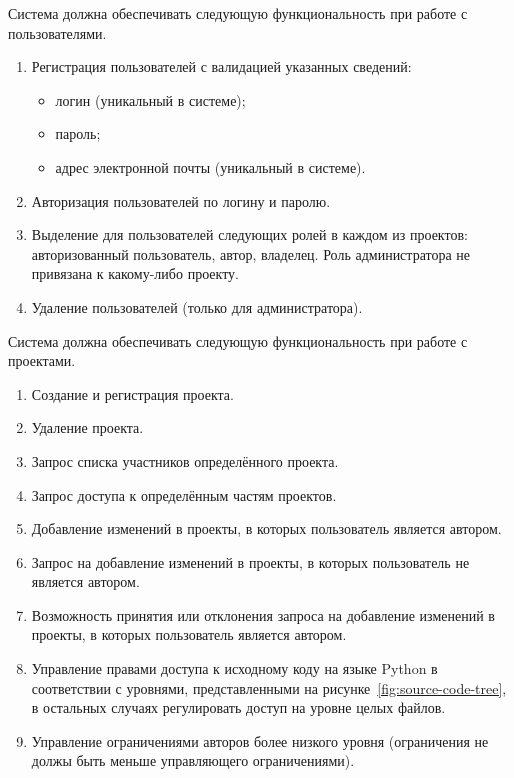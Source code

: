 \documentclass{bmstu}
\begin{document}
  Система должна обеспечивать следующую функциональность при работе с пользователями.
  \begin{enumerate}[label*=\arabic*.]
    \item Регистрация пользователей с валидацией указанных
      сведений:
      \begin{itemize}[label=---]
        \item логин (уникальный в системе);
        \item пароль;
        \item адрес электронной почты (уникальный в системе).
      \end{itemize}
    \item Авторизация пользователей по логину и паролю.
    \item Выделение для пользователей следующих ролей в каждом из проектов: авторизованный пользователь, автор, владелец. Роль администратора не привязана к какому-либо проекту.
    \item Удаление пользователей (только для администратора).
  \end{enumerate}

  Система должна обеспечивать следующую функциональность при работе с проектами.
  \begin{enumerate}[label*=\arabic*.]
    \item Создание и регистрация проекта.
    \item Удаление проекта.
    \item Запрос списка участников определённого проекта.
    \item Запрос доступа к определённым частям проектов.
    \item Добавление изменений в проекты, в которых пользователь является автором.
    \item Запрос на добавление изменений в проекты, в которых пользователь не является автором.
    \item Возможность принятия или отклонения запроса на добавление изменений в проекты, в которых пользователь является автором.
    \item Управление правами доступа к исходному коду на языке Python в соответствии с уровнями, представленными на рисунке~\ref{fig:source-code-tree}, в остальных случаях регулировать доступ на уровне целых файлов.
    \item Управление ограничениями авторов более низкого уровня (ограничения не должы быть меньше управляющего ограничениями).
  \end{enumerate}
\end{document}
